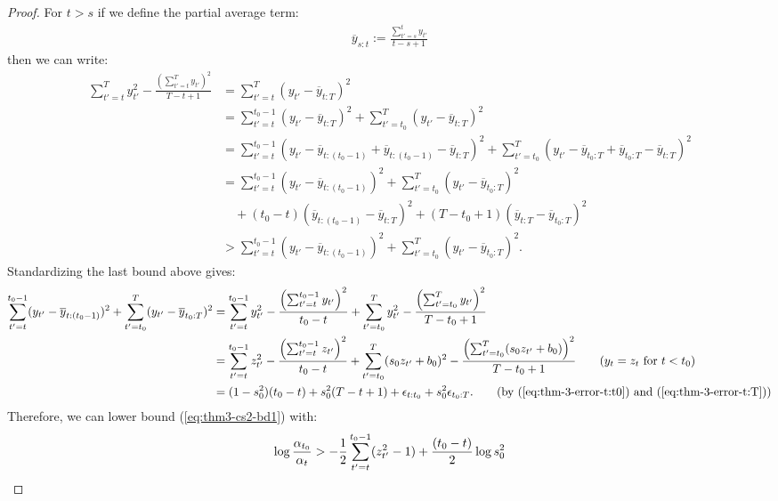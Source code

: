 \begin{proof}
For $t > s$ if we define the partial average term:
\begin{align*}
    \overline{y}_{s:t} := \frac{\sum_{t'=s}^t y_{t'}}{t-s+1} 
\end{align*}
then we can write:
\small
\begin{align*}
    \sum_{t'=t}^T y_{t'}^2 - \frac{\left(\sum_{t'=t}^T y_{t'}\right)^2}{T-t+1} &= \sum_{t'=t}^T (y_{t'} - \overline{y}_{t:T})^2 \\
    &= \sum_{t'=t}^{t_0-1 } (y_{t'} - \overline{y}_{t:T})^2 + \sum_{t'=t_0}^T (y_{t'} - \overline{y}_{t:T})^2 \\
    &= \sum_{t'=t}^{t_0-1 } (y_{t'} - \overline{y}_{t:(t_0-1)} + \overline{y}_{t:(t_0-1)} - \overline{y}_{t:T})^2 + \sum_{t'=t_0}^T (y_{t'} - \overline{y}_{t_0:T} + \overline{y}_{t_0:T} - \overline{y}_{t:T})^2 \\
    &= \sum_{t'=t}^{t_0-1 } (y_{t'} - \overline{y}_{t:(t_0-1)})^2 + \sum_{t'=t_0}^T (y_{t'} - \overline{y}_{t_0:T})^2 \\
    &\quad + (t_0-t)(\overline{y}_{t:(t_0-1)} - \overline{y}_{t:T})^2  +  (T-t_0+1)(\overline{y}_{t:T} - \overline{y}_{t_0:T})^2 \\
    &> \sum_{t'=t}^{t_0-1 } (y_{t'} - \overline{y}_{t:(t_0-1)})^2 + \sum_{t'=t_0}^T (y_{t'} - \overline{y}_{t_0:T})^2.
\end{align*}
\normalsize
Standardizing the last bound above gives:
\small
\begin{align*}
    \sum_{t'=t}^{t_0-1 } (y_{t'} - \overline{y}_{t:(t_0-1)})^2 + \sum_{t'=t_0}^T (y_{t'} - \overline{y}_{t_0:T})^2 &= \sum_{t'=t}^{t_0-1 } y^2_{t'} - \frac{\left(\sum_{t'=t}^{t_0-1 } y_{t'}\right)^2}{t_0-t} + \sum_{t'=t_0}^{T} y^2_{t'} - \frac{\left(\sum_{t'=t_0}^{T} y_{t'}\right)^2}{T-t_0+1} \\
    &= \sum_{t'=t}^{t_0-1 } z^2_{t'} - \frac{\left(\sum_{t'=t}^{t_0-1 } z_{t'}\right)^2}{t_0-t} + \sum_{t'=t_0}^{T} (s_0 z_{t'} + b_0)^2  - \frac{\left(\sum_{t'=t_0}^{T} (s_0 z_{t'} + b_0)\right)^2}{T-t_0+1} \tag{$y_t = z_t$ for $t < t_0$} \\
    &= (1 - s_0^2)(t_0 - t) + s_0^2(T-t +1) + \epsilon_{t:t_0}+ s^2_0\epsilon_{t_0:T}. \tag{by (\ref{eq:thm-3-error-t:t0}) and (\ref{eq:thm-3-error-t:T})}
\end{align*}
\normalsize
Therefore, we can lower bound (\ref{eq:thm3-cs2-bd1}) with:
\begin{align}
    \log \frac{\alpha_{t_0}}{\alpha_t} &> - \frac{1}{2} \sum_{t' = t}^{t_0 - 1} (z_{t'}^2-1) + \frac{(t_0-t)}{2}\log s_0^2 \notag \\

\end{align}
\end{proof}
